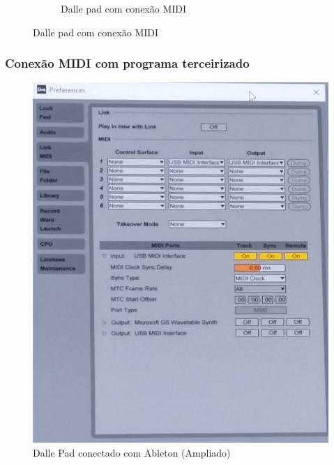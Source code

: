 \documentclass[hyperref={pdfpagelabels=false}]{beamer}
\begin{document}
\begin{frame}
\begin{figure}[H]
\begin{subfigure}[b]{.45\textwidth}
                            	\caption[Dalle pad com conexão MIDI]{Dalle pad com conexão MIDI}
                            	\label{fig:linear-pot}
                            \end{subfigure}
                        \end{figure}


            \end{frame}

            \begin{frame}\frametitle{Conexão MIDI com programa terceirizado}

                        \begin{figure}[H]
                        	\centering
                        	\includegraphics[scale=0.23]{Imagens/ableton3.jpg}
                        	\caption[Dalle Pad conectado com Ableton (Ampliado)]{Dalle Pad conectado com Ableton (Ampliado)}
                        	\label{fig:visao-geral}
                        \end{figure}

            \end{frame}
\end{document}
